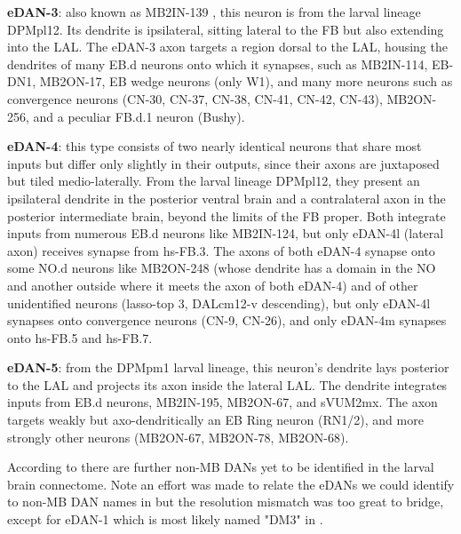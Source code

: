 \textbf{eDAN-3}: also known as MB2IN-139 \citep{eschbach2021circuits}, this neuron is from the larval lineage DPMpl12. Its dendrite is ipsilateral, sitting lateral to the FB but also extending into the LAL. The eDAN-3 axon targets a region dorsal to the LAL, housing the dendrites of  many EB.d neurons onto which it synapses, such as MB2IN-114, EB-DN1, MB2ON-17, EB wedge neurons (only W1), and many more neurons such as convergence neurons (CN-30, CN-37, CN-38, CN-41, CN-42, CN-43), MB2ON-256, and a peculiar FB.d.1 neuron (Bushy).

\textbf{eDAN-4}: this type consists of two nearly identical neurons that share most inputs but differ only slightly in their outputs, since their axons are juxtaposed but tiled medio-laterally. From the larval lineage DPMpl12, they present an ipsilateral dendrite in the posterior ventral brain and a contralateral axon in the posterior intermediate brain, beyond the limits of the FB proper. Both integrate inputs from numerous EB.d neurons like MB2IN-124, but only eDAN-4l (lateral axon) receives synapse from hs-FB.3. The axons of both eDAN-4 synapse onto some NO.d neurons like MB2ON-248 (whose dendrite has a domain in the NO and another outside where it meets the axon of both eDAN-4) and of other unidentified neurons (lasso-top 3, DALcm12-v descending), but only eDAN-4l synapses onto convergence neurons (CN-9, CN-26), and only eDAN-4m synapses onto hs-FB.5 and hs-FB.7.

\textbf{eDAN-5}: from the DPMpm1 larval lineage, this neuron's dendrite lays posterior to the LAL and projects its axon inside the lateral LAL. The dendrite integrates inputs from EB.d neurons, MB2IN-195, MB2ON-67, and sVUM2mx. The axon targets weakly but axo-dendritically an EB Ring neuron (RN1/2), and more strongly other neurons (MB2ON-67, MB2ON-78, MB2ON-68).

According to \citep{selcho2009thgal4} there are further non-MB DANs yet to be identified in the larval brain connectome. Note an effort was made to relate the eDANs we could identify to non-MB DAN names in \citep{selcho2009thgal4} but the resolution mismatch was too great to bridge, except for eDAN-1 which is most likely named "DM3" in \citep{selcho2009thgal4}.


